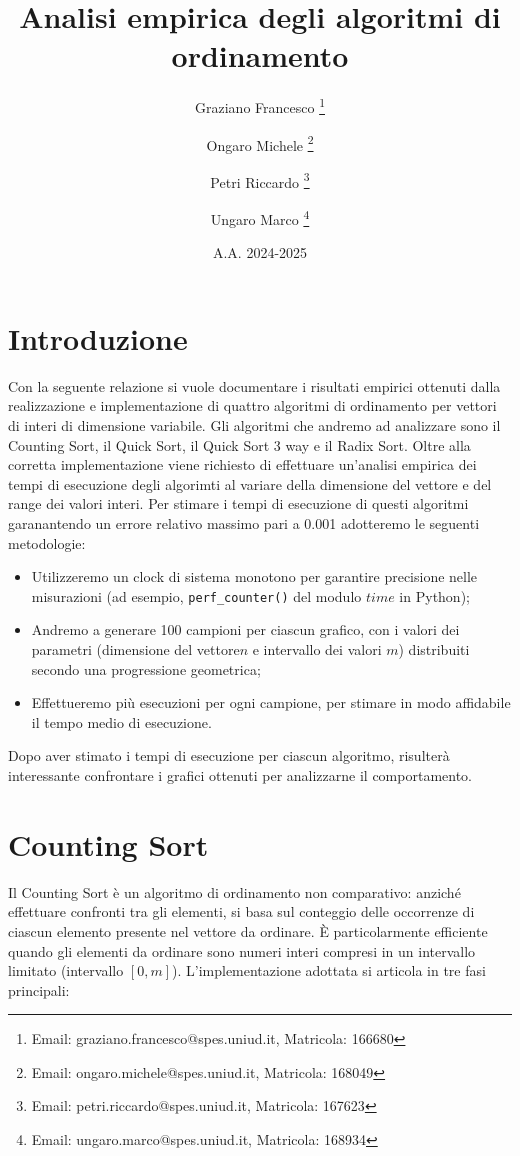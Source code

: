 \documentclass[a4paper, 12pt, oneside]{book}
\title{Analisi empirica degli algoritmi di ordinamento}
\author[ ]{Graziano Francesco \thanks{Email: graziano.francesco@spes.uniud.it, Matricola: 166680}}
\author[ ]{Ongaro Michele \thanks{Email: ongaro.michele@spes.uniud.it, Matricola: 168049}}
\author[ ]{Petri Riccardo \thanks{Email: petri.riccardo@spes.uniud.it, Matricola: 167623}}
\author[ ]{Ungaro Marco \thanks{Email: ungaro.marco@spes.uniud.it, Matricola: 168934}}
\affil[ ]{Università degli Studi di Udine, Dipartimento di Scienze matematiche, informatiche e fisiche}
\date{A.A. 2024-2025}
\begin{document}
\maketitle %
\tableofcontents %


\chapter{Introduzione}\label{chap:Introduzione}

Con la seguente relazione si vuole documentare i risultati empirici ottenuti dalla realizzazione e implementazione di quattro algoritmi di ordinamento per vettori di interi di dimensione variabile.
Gli algoritmi che andremo ad analizzare sono il Counting Sort, il Quick Sort, il Quick Sort 3 way e il Radix Sort.
Oltre alla corretta implementazione viene richiesto di effettuare un'analisi empirica dei tempi di esecuzione degli algorimti al variare della dimensione del vettore e del range dei valori interi. Per stimare i tempi di esecuzione di questi algoritmi garanantendo un errore relativo massimo pari a 0.001 adotteremo le seguenti metodologie:

\begin{itemize}
    \item Utilizzeremo un clock di sistema monotono per garantire precisione nelle misurazioni (ad esempio, \texttt{perf\_counter()} del modulo \(time\) in Python);
    \item Andremo a generare 100 campioni per ciascun grafico, con i valori dei parametri (dimensione del vettore\(n\) e intervallo dei valori \(m\)) distribuiti secondo una progressione geometrica;
    \item Effettueremo più esecuzioni per ogni campione, per stimare in modo affidabile il tempo medio di esecuzione.
\end{itemize}

\noindent Dopo aver stimato i tempi di esecuzione per ciascun algoritmo, risulterà interessante confrontare i grafici ottenuti per analizzarne il comportamento. 



 
\chapter{Counting Sort}\label{chap:Counting Sort} %

Il Counting Sort è un algoritmo di ordinamento non comparativo: anziché effettuare confronti tra gli elementi, si basa sul conteggio delle occorrenze di ciascun elemento presente nel vettore da ordinare.
È particolarmente efficiente quando gli elementi da ordinare sono numeri interi compresi in un intervallo limitato (intervallo \([0, m]\)).
L'implementazione adottata si articola in tre fasi principali:
\end{document}
